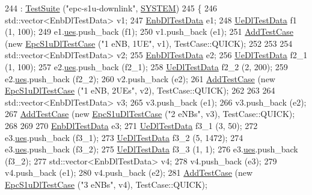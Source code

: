 \begin{DoxyCode}
244   : \hyperlink{classns3_1_1TestSuite_a904b0c40583b744d30908aeb94636d1a}{TestSuite} (\textcolor{stringliteral}{"epc-s1u-downlink"}, \hyperlink{classns3_1_1TestSuite_a1ebfcab34ec8161e085e8e3a1855eae0a90c5529a26ab3a5ffcc6e57040dbd82e}{SYSTEM})
245 \{  
246   std::vector<EnbDlTestData> v1;  
247   \hyperlink{structEnbDlTestData}{EnbDlTestData} e1;
248   \hyperlink{structUeDlTestData}{UeDlTestData} f1 (1, 100);
249   e1.\hyperlink{structEnbDlTestData_a919da2f180c68423fc47ba8e1b088b13}{ues}.push\_back (f1);
250   v1.push\_back (e1);
251   \hyperlink{classns3_1_1TestCase_a3718088e3eefd5d6454569d2e0ddd835}{AddTestCase} (\textcolor{keyword}{new} \hyperlink{classEpcS1uDlTestCase}{EpcS1uDlTestCase} (\textcolor{stringliteral}{"1 eNB, 1UE"}, v1), TestCase::QUICK);
252 
253 
254   std::vector<EnbDlTestData> v2;  
255   \hyperlink{structEnbDlTestData}{EnbDlTestData} e2;
256   \hyperlink{structUeDlTestData}{UeDlTestData} f2\_1 (1, 100);
257   e2.\hyperlink{structEnbDlTestData_a919da2f180c68423fc47ba8e1b088b13}{ues}.push\_back (f2\_1);
258   \hyperlink{structUeDlTestData}{UeDlTestData} f2\_2 (2, 200);
259   e2.\hyperlink{structEnbDlTestData_a919da2f180c68423fc47ba8e1b088b13}{ues}.push\_back (f2\_2);
260   v2.push\_back (e2);
261   \hyperlink{classns3_1_1TestCase_a3718088e3eefd5d6454569d2e0ddd835}{AddTestCase} (\textcolor{keyword}{new} \hyperlink{classEpcS1uDlTestCase}{EpcS1uDlTestCase} (\textcolor{stringliteral}{"1 eNB, 2UEs"}, v2), TestCase::QUICK);
262 
263 
264   std::vector<EnbDlTestData> v3;  
265   v3.push\_back (e1);
266   v3.push\_back (e2);
267   \hyperlink{classns3_1_1TestCase_a3718088e3eefd5d6454569d2e0ddd835}{AddTestCase} (\textcolor{keyword}{new} \hyperlink{classEpcS1uDlTestCase}{EpcS1uDlTestCase} (\textcolor{stringliteral}{"2 eNBs"}, v3), TestCase::QUICK);
268 
269 
270   \hyperlink{structEnbDlTestData}{EnbDlTestData} e3;
271   \hyperlink{structUeDlTestData}{UeDlTestData} f3\_1 (3, 50);
272   e3.\hyperlink{structEnbDlTestData_a919da2f180c68423fc47ba8e1b088b13}{ues}.push\_back (f3\_1);
273   \hyperlink{structUeDlTestData}{UeDlTestData} f3\_2 (5, 1472);
274   e3.\hyperlink{structEnbDlTestData_a919da2f180c68423fc47ba8e1b088b13}{ues}.push\_back (f3\_2);
275   \hyperlink{structUeDlTestData}{UeDlTestData} f3\_3 (1, 1);
276   e3.\hyperlink{structEnbDlTestData_a919da2f180c68423fc47ba8e1b088b13}{ues}.push\_back (f3\_2);
277   std::vector<EnbDlTestData> v4;  
278   v4.push\_back (e3);
279   v4.push\_back (e1);
280   v4.push\_back (e2);
281   \hyperlink{classns3_1_1TestCase_a3718088e3eefd5d6454569d2e0ddd835}{AddTestCase} (\textcolor{keyword}{new} \hyperlink{classEpcS1uDlTestCase}{EpcS1uDlTestCase} (\textcolor{stringliteral}{"3 eNBs"}, v4), TestCase::QUICK);

\end{DoxyCode}
